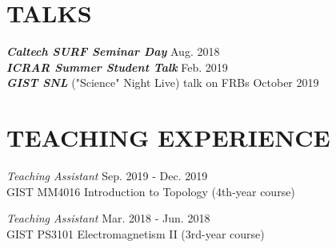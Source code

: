 \documentclass[margin, 10pt]{res} %
\begin{document}
\begin{resume}
\begin{enumerate}
\end{enumerate}

\section{TALKS}
{\bf \sl Caltech SURF Seminar Day} \hfill{Aug. 2018}\\
{\bf \sl ICRAR Summer Student Talk} \hfill{Feb. 2019}\\
{\bf \sl GIST SNL} ("Science" Night Live) talk on FRBs \hfill{October 2019}\\


\section{TEACHING EXPERIENCE}

{\sl Teaching Assistant} \hfill Sep. 2019 - Dec. 2019 \\
GIST MM4016 Introduction to Topology (4th-year course)

{\sl Teaching Assistant} \hfill Mar. 2018 - Jun. 2018 \\
GIST PS3101 Electromagnetism II (3rd-year course)



\end{resume}
\end{document}
